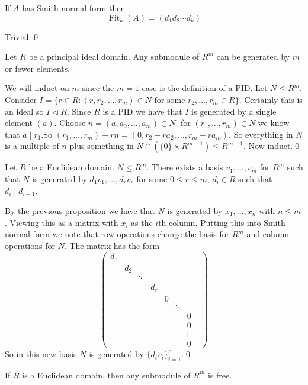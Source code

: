 \documentclass{article}
\newcommand{\nrm}{\triangleleft}
\DeclareMathOperator{\Fit}{Fit}
\begin{document}
\begin{corollary}
  If $ A $ has Smith normal form then
  \[
    \Fit_k(A)=(d_1d_2\cdots d_k)
  \]
\end{corollary}
\pf Trivial \qed
\begin{proposition}
  Let $ R $ be a principal ideal domain. Any submodule of $ R^m $ can be generated by $ m $ or fewer elements.
\end{proposition}
\pf We will induct on $ m $ since the $ m=1 $ case is the definition of a PID. Let $ N\le R^m $. Consider $ I=\{r\in R:(r,r_2,\dots, r_m)\in N \text{ for some } r_2,\dots, r_m\in R\}$. Certainly this is an ideal so $ I\nrm R $. Since $ R $ is a PID we have that $ I $ is generated by a single element $ (a) $. Choose $ n=(a,a_2,\dots, a_m)\in N $. for $ (r_1,\dots, r_m)\in N $ we know that $ a\mid r_1 $.So $ (r_1,\dots, r_m)-rn=(0,r_2-ra_2,\dots, r_m-ra_m) $. So everything in $ N $ is a multiple of $ n $ plus something in $ N\cap (\{0\}\times R^{m-1})\le R^{m-1}  $. Now induct.\qed
\begin{theorem}
	Let $ R $ be a Euclidean domain. $ N\le R^m $. There exists a basis $ v_1,\dots, v_m $ for $ R^m $ such that $ N $ is generated by $ d_1v_1,\dots, d_rv_r $ for some $ 0\le r\le m $, $ d_i\in R $ such that $ d_i\mid d_{i+1} $.
\end{theorem}
\pf By the previous proposition we have that $ N $ is generated by $ x_1,\dots, x_n $ with $ n\le m $. Viewing this as a matrix with $ x_i $ as the $ i $th column. Putting this into Smith normal form we note that row operations change the basis for $ R^m $ and column operations for $ N $. The matrix has the form
\[
  \begin{pmatrix}
	  d_1 & & & & & & & \\
	      & d_2 & & & & & \\
	      & & \ddots & & & & \\
	      & & & d_r & & & \\
	      & & & & 0 & & \\
	      & & & & & \ddots & \\
	      & & & & & & 0 \\
	      & & & & & & 0 \\
	      & & & & & & \vdots \\
	      & & & & & & 0
  \end{pmatrix}
\]
So in this new basis $ N $ is generated by $ \{d_iv_i\}^r_{i=1} $.\qed
\begin{theorem}
	If $ R $ is a Euclidean domain, then any submodule of $ R^m $ is free.
\end{theorem}
\end{document}
